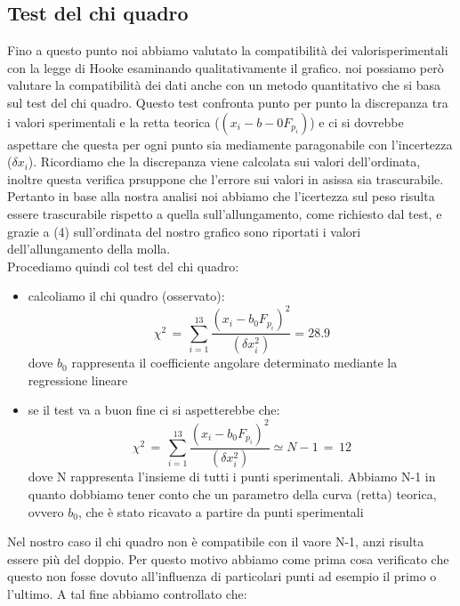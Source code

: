 \subsection{Test del chi quadro}
Fino a questo punto noi abbiamo valutato la compatibilità dei valorisperimentali con la legge di Hooke esaminando qualitativamente il grafico. noi possiamo però valutare la compatibilità dei dati anche con un metodo quantitativo che si basa sul test del chi quadro. Questo test confronta punto per punto la discrepanza tra i valori sperimentali e la retta teorica ($(x_i - b-0 F_{p_i})$) e ci si dovrebbe aspettare che questa per ogni punto sia mediamente paragonabile con l'incertezza ($\delta x_i$). Ricordiamo che la discrepanza viene calcolata sui valori dell'ordinata, inoltre questa verifica prsuppone che l'errore sui valori in asissa sia trascurabile.
Pertanto in base alla nostra analisi noi abbiamo che l'icertezza sul peso risulta essere trascurabile rispetto  a quella sull'allungamento, come richiesto dal test, e grazie a (4) sull'ordinata del nostro grafico sono riportati i valori dell'allungamento della molla.\\
Procediamo quindi col test del chi quadro:
\begin{itemize}
\item{calcoliamo il chi quadro (osservato):
	\begin{equation*}
		\chi^2 \,=\, \sum_{i=1}^{13} \frac{(x_i - b_0 F_{p_i})^2}{(\delta x_i^2)} = 28.9
	\end{equation*}
	dove $b_0$ rappresenta il coefficiente angolare determinato mediante la regressione lineare}
\item{se il test va a buon fine ci si aspetterebbe che:
	\begin{equation*}
		\chi^2 \,=\, \sum_{i=1}^{13} \frac{(x_i - b_0 F_{p_i})^2}{(\delta x_i^2)} \simeq N - 1 \,=\, 12
	\end{equation*}
	dove N rappresenta l'insieme di tutti i punti sperimentali. Abbiamo N-1 in quanto dobbiamo tener conto che un parametro della curva (retta) teorica, ovvero $b_0$, che è stato ricavato a partire da punti sperimentali}
\end{itemize}
Nel nostro caso il chi quadro non è compatibile con il vaore N-1, anzi risulta essere più del doppio.
Per questo motivo abbiamo come prima cosa verificato che questo non fosse dovuto all'influenza di particolari punti ad esempio il primo o l'ultimo. A tal fine abbiamo controllato che:

